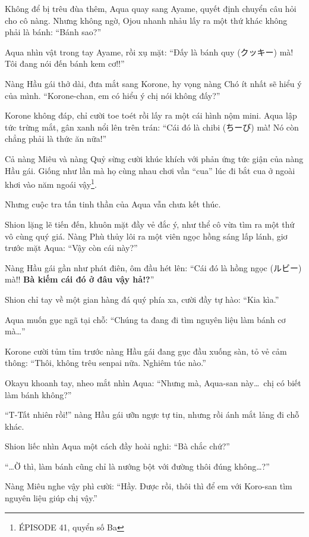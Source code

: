 \documentclass[../main.tex]{subfiles}
\begin{document}
Không để bị trêu đùa thêm, Aqua quay sang Ayame, quyết định chuyển câu hỏi cho cô nàng. Nhưng không ngờ, Ojou nhanh nhảu lấy ra một thứ khác không phải là bánh: ``Bánh sao?''

Aqua nhìn vật trong tay Ayame, rồi xụ mặt: ``Đấy là bánh quy (クッキー) mà! Tôi đang nói đến bánh kem cơ!!''

Nàng Hầu gái thở dài, đưa mắt sang Korone, hy vọng nàng Chó ít nhất sẽ hiểu ý của mình. ``Korone-chan, em có hiểu ý chị nói không đấy?''

Korone không đáp, chỉ cười toe toét rồi lấy ra một cái hình nộm mini. Aqua lập tức trừng mắt, gân xanh nổi lên trên trán: ``Cái đó là chibi (ちーび) mà! Nó còn chẳng phải là thức ăn nữa!''

Cả nàng Miêu và nàng Quỷ sừng cười khúc khích với phản ứng tức giận của nàng Hầu gái. Giống như lần mà họ cùng nhau chơi vần ``cua'' lúc đi bắt cua ở ngoài khơi vào năm ngoái vậy\footnote{{\flaregothic ÉPISODE 41}, quyển số Ba}.

Nhưng cuộc tra tấn tinh thần của Aqua vẫn chưa kết thúc.

Shion lặng lẽ tiến đến, khuôn mặt đầy vẻ đắc ý, như thể cô vừa tìm ra một thứ vô cùng quý giá. Nàng Phù thủy lôi ra một viên ngọc hồng sáng lấp lánh, giơ trước mặt Aqua: ``Vậy còn cái này?''

Nàng Hầu gái gần như phát điên, ôm đầu hét lên: ``Cái đó là hồng ngọc (ルビー) mà!! \textbf{Bà kiếm cái đó ở đâu vậy hả!?}''

Shion chỉ tay về một gian hàng đá quý phía xa, cười đầy tự hào: ``Kia kìa.''

Aqua muốn gục ngã tại chỗ: ``Chúng ta đang đi tìm nguyên liệu làm bánh cơ mà\dots''

Korone cười tủm tỉm trước nàng Hầu gái đang gục đầu xuống sàn, tỏ vẻ cảm thông: ``Thôi, không trêu senpai nữa. Nghiêm túc nào.''

\ct

Okayu khoanh tay, nheo mắt nhìn Aqua: ``Nhưng mà, Aqua-san này\dots\ chị có biết làm bánh không?''

``T-Tất nhiên rồi!'' nàng Hầu gái ưỡn ngực tự tin, nhưng rồi ánh mắt lảng đi chỗ khác.

Shion liếc nhìn Aqua một cách đầy hoài nghi: ``Bà chắc chứ?''

``\dots Ờ thì, làm bánh cũng chỉ là nướng bột với đường thôi đúng không\dots?''

Nàng Miêu nghe vậy phì cười: ``Hầy. Được rồi, thôi thì để em với Koro-san tìm nguyên liệu giúp chị vậy.''
\end{document}
